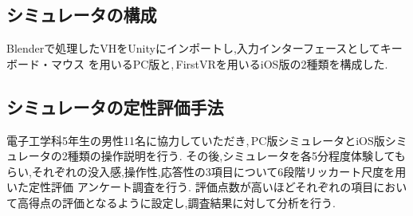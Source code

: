 \documentclass{ltjsarticle}
\begin{document}
	\subsection{シミュレータの構成}
		Blenderで処理したVHをUnityにインポートし,入力インターフェースとしてキーボード・マウス
		を用いるPC版と,\,FirstVRを用いるiOS版の2種類を構成した.
		
	\subsection{シミュレータの定性評価手法}
		電子工学科5年生の男性11名に協力していただき,\,PC版シミュレータとiOS版シミュレータの2種類の操作説明を行う.
		その後,シミュレータを各5分程度体験してもらい,それぞれの没入感,操作性,応答性の3項目について6段階リッカート尺度を用いた定性評価
		アンケート調査を行う.
		評価点数が高いほどそれぞれの項目において高得点の評価となるように設定し,調査結果に対して分析を行う.
\end{document}
